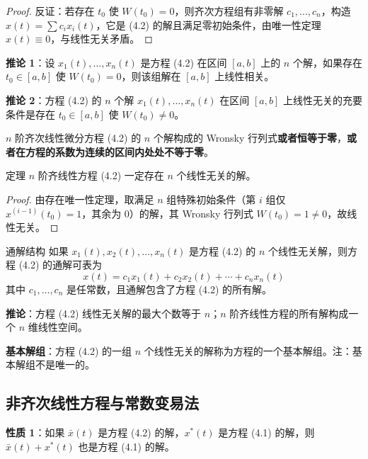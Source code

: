 \begin{proof}
反证：若存在 $t_0$ 使 $W(t_0) = 0$，则齐次方程组有非零解 $c_1, \ldots, c_n$，构造 $x(t) = \sum c_i x_i(t)$，它是 (4.2) 的解且满足零初始条件，由唯一性定理 $x(t) \equiv 0$，与线性无关矛盾。
\end{proof}

\textbf{推论 1}：设 $x_1(t), \ldots, x_n(t)$ 是方程 (4.2) 在区间 $[a,b]$ 上的 $n$ 个解，如果存在 $t_0 \in [a,b]$ 使 $W(t_0) = 0$，则该组解在 $[a,b]$ 上线性相关。

\textbf{推论 2}：方程 (4.2) 的 $n$ 个解 $x_1(t), \ldots, x_n(t)$ 在区间 $[a,b]$ 上线性无关的充要条件是存在 $t_0 \in [a,b]$ 使 $W(t_0) \neq 0$。

\begin{remark}
$n$ 阶齐次线性微分方程 (4.2) 的 $n$ 个解构成的 Wronsky 行列式\textbf{或者恒等于零}，\textbf{或者在方程的系数为连续的区间内处处不等于零}。
\end{remark}

\begin{myTheorem}{定理}
$n$ 阶齐线性方程 (4.2) 一定存在 $n$ 个线性无关的解。
\end{myTheorem}

\begin{proof}
由存在唯一性定理，取满足 $n$ 组特殊初始条件（第 $i$ 组仅 $x^{(i-1)}(t_0) = 1$，其余为 0）的解，其 Wronsky 行列式 $W(t_0) = 1 \neq 0$，故线性无关。
\end{proof}

\begin{myTheorem}{通解结构}
如果 $x_1(t), x_2(t), \ldots, x_n(t)$ 是方程 (4.2) 的 $n$ 个线性无关解，则方程 (4.2) 的通解可表为
\begin{equation}x(t) = c_1x_1(t) + c_2x_2(t) + \cdots + c_nx_n(t) \tag{4.11}\end{equation}
其中 $c_1, \ldots, c_n$ 是任常数，且通解包含了方程 (4.2) 的所有解。
\end{myTheorem}

\textbf{推论}：方程 (4.2) 线性无关解的最大个数等于 $n$；$n$ 阶齐线性方程的所有解构成一个 $n$ 维线性空间。

\textbf{基本解组}：方程 (4.2) 的一组 $n$ 个线性无关的解称为方程的一个基本解组。注：基本解组不是唯一的。

\subsection{非齐次线性方程与常数变易法}

\textbf{性质 1}：如果 $\bar{x}(t)$ 是方程 (4.2) 的解，$x^*(t)$ 是方程 (4.1) 的解，则 $\bar{x}(t) + x^*(t)$ 也是方程 (4.1) 的解。

